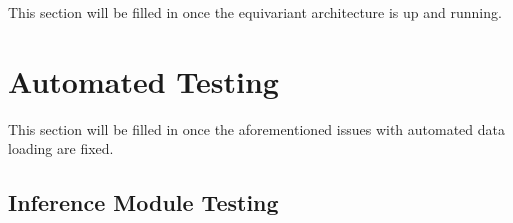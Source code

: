 \documentclass[12pt, titlepage]{article}
\begin{document}
This section will be filled in once the equivariant architecture is up and running.

\section{Automated Testing}

This section will be filled in once the aforementioned issues with automated data loading are fixed.

\subsection{Inference Module Testing}

		






\newpage{}
\end{document}
